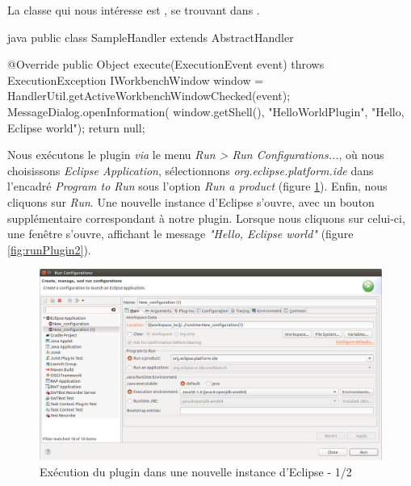 La classe qui nous intéresse est , se trouvant dans .

\begin{imtaCode}{java}
public class SampleHandler extends AbstractHandler {

    @Override
    public Object execute(ExecutionEvent event) throws ExecutionException {
        IWorkbenchWindow window = HandlerUtil.getActiveWorkbenchWindowChecked(event);
            MessageDialog.openInformation(
                            window.getShell(),
                            "HelloWorldPlugin",
                            "Hello, Eclipse world");
            return null;
    }
}
\end{imtaCode}

Nous exécutons le plugin \textit{via} le menu \textit{Run > Run Configurations...}, où nous choisissons \textit{Eclipse Application}, sélectionnons \textit{org.eclipse.platform.ide} %
dans l'encadré \textit{Program to Run} sous l'option \textit{Run a product} (figure \ref{fig:runPlugin1}).
Enfin, nous cliquons sur \textit{Run}.
Une nouvelle instance d'Eclipse s'ouvre, avec un bouton supplémentaire correspondant à notre plugin.
Lorsque nous cliquons sur celui-ci, une fenêtre s'ouvre, affichant le message \textit{"Hello, Eclipse world"} (figure \ref{fig:runPlugin2}).

\begin{figure}[H]
    \centering

    \includegraphics{pictures/runPlugin1.png}

    \caption{Exécution du plugin dans une nouvelle instance d'Eclipse - 1/2}
    \label{fig:runPlugin1}
\end{figure}

